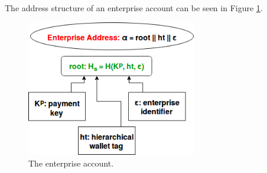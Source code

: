 The address structure of an enterprise account can be seen in Figure \ref{fig:enterprise_account_plain}.

\begin{figure}
  \begin{center}
    \includegraphics[width=210pt]{figures/enterprise_account_plain.png}
  \end{center}
  \caption{The enterprise account.}
  \label{fig:enterprise_account_plain}
\end{figure}
